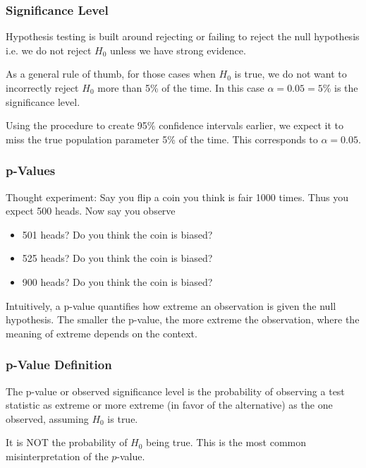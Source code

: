 \documentclass[handout]{beamer}
\newcommand{\blue}[1]{\textcolor{blue2}{#1}}
\begin{document}
\begin{frame}
\frametitle{Significance Level}
Hypothesis testing is built around rejecting or failing to reject the null hypothesis\\
i.e. we do not reject $H_0$ unless we have \blue{strong evidence}.

\pause \vspace{0.5cm}

As a general rule of thumb, for those cases when $H_0$ is true, we do not want to incorrectly reject $H_0$ more than 5\% of the time.  In this case $\alpha = 0.05 = 5\%$ is the \blue{significance level}.  

\pause \vspace{0.5cm}

Using the procedure to create 95\% confidence intervals earlier, we expect it to miss the true population parameter 5\% of the time.  This corresponds to $\alpha=0.05$.   
\end{frame}



\begin{frame}
\frametitle{p-Values}
Thought experiment:  Say you flip a coin you think is fair 1000 times.  Thus you expect 500 heads.   Now say you observe
\begin{itemize}
\pause \item 501 heads? Do you think the coin is biased?
\pause \item 525 heads? Do you think the coin is biased?
\pause \item 900 heads? Do you think the coin is biased?
\end{itemize}
\pause Intuitively, a \blue{p-value} quantifies how \blue{extreme} an observation is given the null hypothesis.  
\vskip 0.25cm
\pause The smaller the p-value, the more \blue{extreme} the observation, where the meaning of extreme depends on the context.  
\end{frame}



\begin{frame}
\frametitle{p-Value Definition}
The \blue{p-value} or \blue{observed significance level} is the probability of observing a test statistic as extreme or more extreme (in favor of the alternative) as the one observed, assuming $H_0$ is true.

\vspace{0.5cm}

\pause It is \blue{NOT} the probability of $H_0$ being true.  This is the most common misinterpretation of the $p$-value.

\end{frame}
\end{document}
